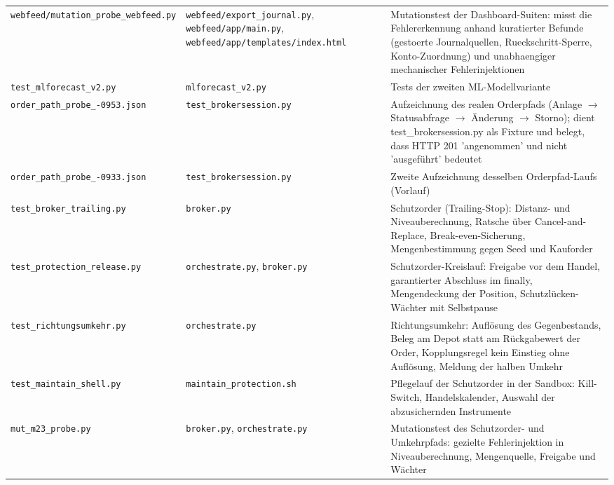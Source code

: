 \begin{longtable}{@{}p{}p{}p{}@{}}
  \texttt{webfeed/\allowbreak mutation\_\allowbreak probe\_\allowbreak webfeed.py} & \texttt{webfeed/\allowbreak export\_\allowbreak journal.py}, \texttt{webfeed/\allowbreak app/\allowbreak main.py}, \texttt{webfeed/\allowbreak app/\allowbreak templates/\allowbreak index.html} & Mutationstest der Dashboard-Suiten: misst die Fehlererkennung anhand kuratierter Befunde (gestoerte Journalquellen, Rueckschritt-Sperre, Konto-Zuordnung) und unabhaengiger mechanischer Fehlerinjektionen \\
  \texttt{test\_\allowbreak mlforecast\_\allowbreak v2.py} & \texttt{mlforecast\_\allowbreak v2.py} & Tests der zweiten ML-Modellvariante \\
  \texttt{order\_\allowbreak path\_\allowbreak probe\_\allowbreak 20260724-0953.json} & \texttt{test\_\allowbreak brokersession.py} & Aufzeichnung des realen Orderpfads (Anlage $\to$ Statusabfrage $\to$ Änderung $\to$ Storno); dient test\_brokersession.py als Fixture und belegt, dass HTTP 201 'angenommen' und nicht 'ausgeführt' bedeutet \\
  \texttt{order\_\allowbreak path\_\allowbreak probe\_\allowbreak 20260724-0933.json} & \texttt{test\_\allowbreak brokersession.py} & Zweite Aufzeichnung desselben Orderpfad-Laufs (Vorlauf) \\
  \texttt{test\_\allowbreak broker\_\allowbreak trailing.py} & \texttt{broker.py} & Schutzorder (Trailing-Stop): Distanz- und Niveauberechnung, Ratsche über Cancel-and-Replace, Break-even-Sicherung, Mengenbestimmung gegen Seed und Kauforder \\
  \texttt{test\_\allowbreak protection\_\allowbreak release.py} & \texttt{orchestrate.py}, \texttt{broker.py} & Schutzorder-Kreislauf: Freigabe vor dem Handel, garantierter Abschluss im finally, Mengendeckung der Position, Schutzlücken-Wächter mit Selbstpause \\
  \texttt{test\_\allowbreak richtungsumkehr.py} & \texttt{orchestrate.py} & Richtungsumkehr: Auflösung des Gegenbestands, Beleg am Depot statt am Rückgabewert der Order, Kopplungsregel kein Einstieg ohne Auflösung, Meldung der halben Umkehr \\
  \texttt{test\_\allowbreak maintain\_\allowbreak shell.py} & \texttt{maintain\_\allowbreak protection.sh} & Pflegelauf der Schutzorder in der Sandbox: Kill-Switch, Handelskalender, Auswahl der abzusichernden Instrumente \\
  \texttt{mut\_\allowbreak m23\_\allowbreak probe.py} & \texttt{broker.py}, \texttt{orchestrate.py} & Mutationstest des Schutzorder- und Umkehrpfads: gezielte Fehlerinjektion in Niveauberechnung, Mengenquelle, Freigabe und Wächter \\

\end{longtable}
